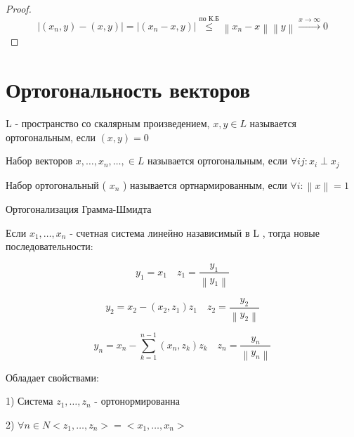 \documentclass[12pt, a4paper]{report}
\begin{document}
\begin{proof}

    \[ |(x_n, y ) -(x,y )  | = |(x_n- x,y ) | \overset{\text{по К.Б} }{\le}  \left\lVert x_n - x  \right\rVert \left\lVert y \right\rVert \xrightarrow{x \to  \infty } 0   \] 
\end{proof}

\section{Ортогональность векторов}

\begin{definition}
    L  - пространство со скалярным произведением, \( x, y \in  L \) называется ортогональным, если \( (x,y ) = 0   \) 

    
\end{definition}

\begin{definition}
    Набор векторов \( x, \ldots, x_n, \ldots,   \in  L \) называется ортогональным, если \( \forall  ij : x_i \perp x_j  \) 
\end{definition}


\begin{definition}
    Набор ортогональный ( \( x_n     \) ) называется ортнармированным, если \( \forall  i :  \left\lVert x  \right\rVert = 1   \) 
\end{definition}

Ортогонализация Грамма-Шмидта

Если \( x_1, \ldots, x_n  \)  - счетная система линейно назависимый в  L , тогда новые последовательности: 

\[ y_1 = x_1 \quad  z_1 = \frac{y_1}{\left\lVert y_1  \right\rVert}  \] 

\[ y_2 = x_2 - ( x_2 , z_1 ) z_1  \quad  z_2 = \frac{y_2}{\left\lVert y_2  \right\rVert} \] 

\[ y_n = x_n - \sum ^{n-1 }_{k =1}( x_n , z_k ) z_k  \quad  z_n = \frac{y_n}{\left\lVert y_n  \right\rVert}    \] 

Обладает свойствами: 

1) Система \( z_1, \ldots, z_n   \) - ортонормированна

2) \( \forall n \in  N <z_1, \ldots, z_n > = <x_1, \ldots, x_n>\) 

\ifdefined\mainfile
\else
    
\end{document}

